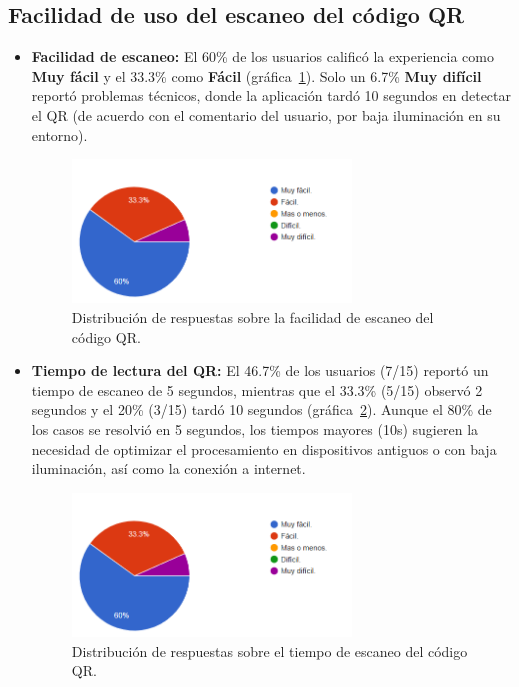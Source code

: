 \subsection{Facilidad de uso del escaneo del código QR}
\begin{itemize}
	\item \textbf{Facilidad de escaneo:} 
	El 60\% de los usuarios calificó la experiencia como \textbf{Muy fácil} y el 33.3\% como \textbf{Fácil} (gráfica~\ref{fig:facilidad-escaneo}). 
	Solo un 6.7\% \textbf{Muy difícil} reportó problemas técnicos, donde la aplicación tardó 10 segundos en detectar el QR (de acuerdo con el comentario del usuario, por baja iluminación en su entorno).
	
	\begin{figure}
		\centering
		\includegraphics[width=0.7\textwidth]{images/grafico_escaneo.png}
		\caption{Distribución de respuestas sobre la facilidad de escaneo del código QR.}
		\label{fig:facilidad-escaneo}
	\end{figure}
	
	\item \textbf{Tiempo de lectura del QR:}  
	El 46.7\% de los usuarios (7/15) reportó un tiempo de escaneo de 5 segundos, mientras que el 33.3\% (5/15) observó 2 segundos y el 20\% (3/15) tardó 10 segundos (gráfica~\ref{fig:tiempo-escaneo}).  
	Aunque el 80\% de los casos se resolvió en 5 segundos, los tiempos mayores (10s) sugieren la necesidad de optimizar el procesamiento en dispositivos antiguos o con baja iluminación, así como la conexión a internet.
	
	\begin{figure}
		\centering
		\includegraphics[width=0.7\textwidth]{images/grafico_escaneo.png}
		\caption{Distribución de respuestas sobre el tiempo de escaneo del código QR.}
		\label{fig:tiempo-escaneo}
	\end{figure}
	

\end{itemize}
